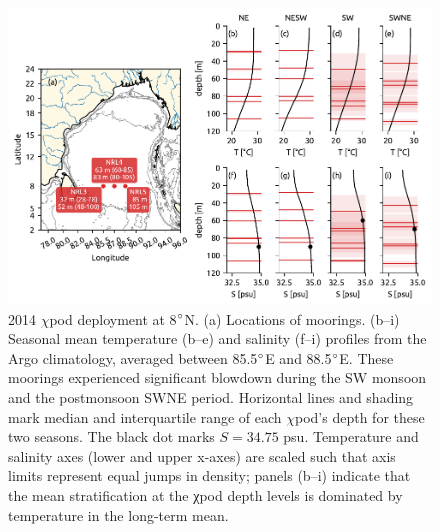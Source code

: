 \documentclass[twocol]{ametsoc}
\begin{document}
\begin{figure}
\centering
\includegraphics[width=\textwidth]{figure3-map.pdf}
\caption{\label{fig:map}
2014 \(\chi\)pod deployment at 8\(\degree\)N. (a) Locations of moorings. (b--i) Seasonal mean temperature (b--e) and salinity (f--i) profiles from the Argo climatology, averaged between 85.5\(\degree\)E and 88.5\(\degree\)E. These moorings experienced significant blowdown during the SW monsoon and the postmonsoon SWNE period. Horizontal lines and shading mark median and interquartile range of each \(\chi\)pod's depth for these two seasons. The black dot marks \(S=34.75\) psu. Temperature and salinity axes (lower and upper x-axes) are scaled such that axis limits represent equal jumps in density; panels (b--i) indicate that the mean stratification at the χpod depth levels is dominated by temperature in the long-term mean.}
\end{figure}
\end{document}
